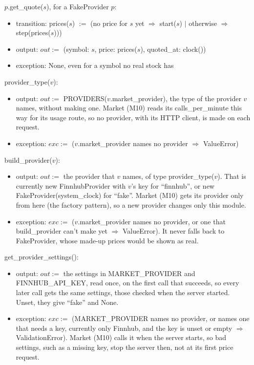 \documentclass[12pt, titlepage]{article}
\begin{document}
\noindent $p$.get\_quote($s$), for a FakeProvider $p$:
\begin{itemize}
\item transition: prices($s$) $:=$ (no price for $s$ yet $\Rightarrow$
  start($s$) $|$ otherwise $\Rightarrow$ step(prices($s$)))
\item output: $out :=$ (symbol: $s$, price: prices($s$), quoted\_at: clock())
\item exception: None, even for a symbol no real stock has
\end{itemize}

\noindent provider\_type($v$):
\begin{itemize}
\item output: $out :=$ PROVIDERS($v$.market\_provider), the type of the
  provider $v$ names, without making one. Market (M10) reads its
  calls\_per\_minute this way for its usage route, so no provider, with its
  HTTP client, is made on each request.
\item exception: $exc :=$ ($v$.market\_provider names no provider
  $\Rightarrow$ ValueError)
\end{itemize}

\noindent build\_provider($v$):
\begin{itemize}
\item output: $out :=$ the provider that $v$ names, of type
  provider\_type($v$). That is currently new FinnhubProvider with $v$'s key
  for ``finnhub'', or new FakeProvider(system\_clock) for ``fake''. Market
  (M10) gets its provider only from here (the factory pattern), so a new
  provider changes only this module.
\item exception: $exc :=$ ($v$.market\_provider names no provider, or one
  that build\_provider can't make yet $\Rightarrow$ ValueError). It never falls
  back to FakeProvider, whose made-up prices would be shown as real.
\end{itemize}

\noindent get\_provider\_settings():
\begin{itemize}
\item output: $out :=$ the settings in MARKET\_PROVIDER and FINNHUB\_API\_KEY,
  read once, on the first call that succeeds, so every later call gets the
  same settings, those checked when the server started. Unset, they give
  ``fake'' and None.
\item exception: $exc :=$ (MARKET\_PROVIDER names no provider, or names one
  that needs a key, currently only Finnhub, and the key is unset or empty
  $\Rightarrow$ ValidationError). Market (M10) calls it when the server
  starts, so bad settings, such as a missing key, stop the server then, not
  at its first price request.
\end{itemize}
\end{document}
